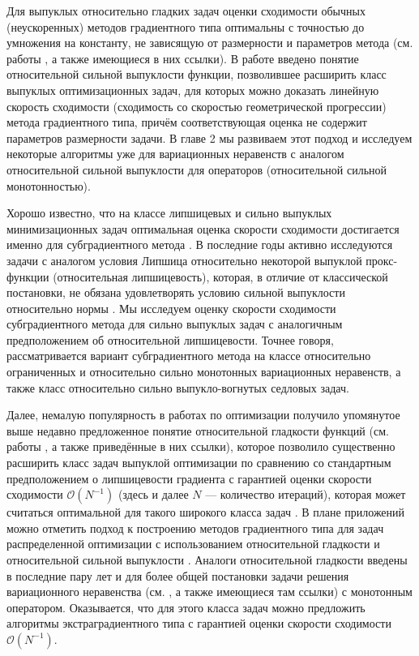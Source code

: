 Для выпуклых относительно гладких задач оценки сходимости обычных (неускоренных) методов градиентного типа оптимальны с точностью до умножения на константу, не зависящую от размерности и параметров метода (см. работы \cite{Bauschke,Drag,Dragomir,Lu_Nesterov_2018}, а также имеющиеся в них ссылки). В работе \cite{Lu_Nesterov_2018} введено понятие относительной сильной выпуклости функции, позволившее расширить класс выпуклых оптимизационных задач, для которых можно доказать линейную скорость сходимости (сходимость со скоростью геометрической прогрессии) метода градиентного типа, причём соответствующая оценка не содержит параметров размерности задачи. В главе 2 мы развиваем этот подход и исследуем некоторые алгоритмы уже для вариационных неравенств с аналогом относительной сильной выпуклости для операторов (относительной сильной монотонностью).

Хорошо известно, что на классе липшицевых и сильно выпуклых минимизационных задач оптимальная оценка скорости сходимости достигается именно для субградиентного метода \cite{Bach_2012}. В последние годы активно исследуются задачи с аналогом условия Липшица относительно некоторой выпуклой прокс-функции (относительная липшицевость), которая, в отличие от классической постановки, не обязана удовлетворять условию сильной выпуклости относительно нормы \cite{AdaMirr_2021,Lu_2018,Zhou_NIPS_2020}. Мы исследуем оценку скорости сходимости субградиентного метода для сильно выпуклых задач с аналогичным предположением об относительной липшицевости. Точнее говоря, рассматривается вариант субградиентного метода на классе относительно ограниченных и относительно сильно монотонных вариационных неравенств, а также класс относительно сильно выпукло-вогнутых седловых задач. 

Далее, немалую популярность в работах по оптимизации получило упомянутое выше недавно предложенное понятие относительной гладкости функций (см. работы \cite{Bauschke,Drag,Dragomir,Lu_Nesterov_2018}, а также приведённые в них ссылки), которое позволило существенно расширить класс задач выпуклой оптимизации по сравнению со стандартным предположением о липшицевости градиента с гарантией оценки скорости сходимости $\mathcal{O}(N^{-1})$ (здесь и далее $N$ --- количество итераций), которая может считаться оптимальной для такого широкого класса задач \cite{Dragomir}. В плане приложений можно отметить подход к построению методов градиентного типа для задач распределенной оптимизации с использованием относительной гладкости и относительной сильной выпуклости \cite{Hendr}. Аналоги относительной гладкости введены в последние пару лет и для более общей постановки задачи решения вариационного неравенства (см. \cite{Inex}, а также имеющиеся там ссылки) с монотонным оператором. Оказывается, что для этого класса задач можно предложить алгоритмы экстраградиентного типа с гарантией оценки скорости сходимости $\mathcal{O}(N^{-1})$. 

